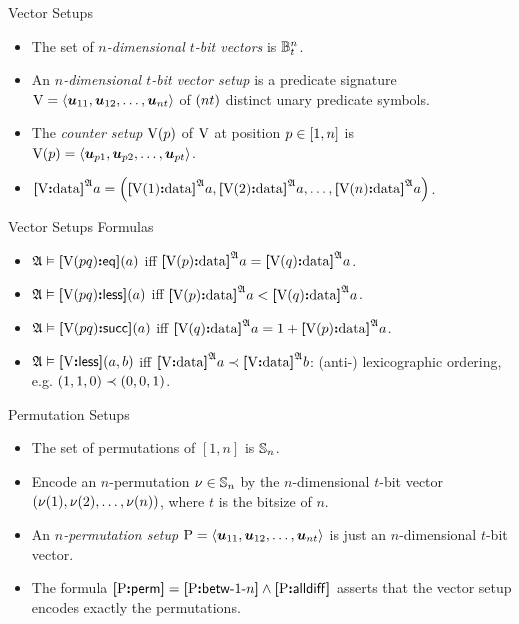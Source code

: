 \documentclass{beamer}
\begin{document}
\begin{frame}{Vector Setups}
\begin{itemize}
  \item The set of \emph{$n$-dimensional $t$-bit vectors} is
  $\ntBitnums\nn\tbit$.
  \item An \emph{$n$-dimensional $t$-bit vector setup} is a predicate signature 
  $\VS = \seq{\suu{11}, \suu{12}, \dots, \suu{\nn\tbit}}$ of $(\nn\tbit)$
  distinct unary predicate symbols.
  \item The \emph{counter setup $\VSp\posp$} of $\VS$ at position $\posp \in [1,\nn]$
  is $\VSp\posp = \seq{\suu{\posp1},\suu{\posp2},\dots,\suu{\posp\tbit}}$.
  \item
    $\data\VS\StrA\ea = \left(\data{\VSp1}\StrA\ea,\data{\VSp2}\StrA\ea, \dots,
    \data{\VSp\nn}\StrA\ea\right)$.
\end{itemize}
\end{frame}

\begin{frame}{Vector Setups Formulas}
\begin{itemize}
  \item $\StrA\vDash\feqP\VS\posp\posq(\ea)$ iff $\data{\VSp\posp}\StrA\ea =
  \data{\VSp\posq}\StrA\ea$.
  \item $\StrA\vDash\flessP\VS\posp\posq(\ea)$ iff $\data{\VSp\posp}\StrA\ea <
  \data{\VSp\posq}\StrA\ea$.
  \item $\StrA\vDash\fsuccP\VS\posp\posq(\ea)$ iff $\data{\VSp\posq}\StrA\ea =
  1 + \data{\VSp\posp}\StrA\ea$.
  \item $\StrA\vDash\fless\VS(\ea,\eb)$ iff
  $\data{\VS}\StrA\ea\lexlt\data{\VS}\StrA\eb$: (anti-) lexicographic ordering,
  e.g. $(1,1,0)\lexlt (0,0,1)$.
\end{itemize}
\end{frame}

\begin{frame}{Permutation Setups}
\begin{itemize}
  \item The set of permutations of $[1,n]$ is $\Perms\nn$.
  \item Encode an $n$-permutation $\permnu\in\Perms\nn$ by the
  $n$-dimensional $t$-bit vector $(\permnu(1), \permnu(2), \dots, \permnu(n))$, where $t$ is the bitsize
  of $n$.
  \item An \emph{$n$-permutation setup} $\PS =
  \seq{\suu{11},\suu{12},\dots,\suu{nt}}$ is just an $n$-dimensional $t$-bit
  vector.
  \item The formula
  $\fperm\PS = \fbetw\PS1\nn \land \falldiff\PS$ asserts that the vector setup
  encodes exactly the permutations.
\end{itemize}
\end{frame}
\end{document}
